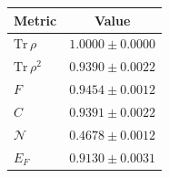 \begin{tabular}{lc}
\hline
Metric & Value \\
\hline
$\mathrm{Tr}\,\rho$ & $1.0000\pm0.0000$ \\
$\mathrm{Tr}\,\rho^2$ & $0.9390\pm0.0022$ \\
$F$ & $0.9454\pm0.0012$ \\
$C$ & $0.9391\pm0.0022$ \\
$\mathcal{N}$ & $0.4678\pm0.0012$ \\
$E_F$ & $0.9130\pm0.0031$ \\
\hline
\end{tabular}